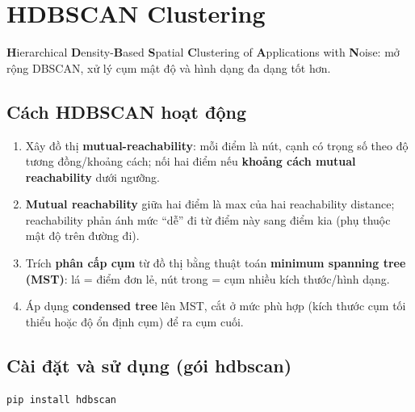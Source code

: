 \section{HDBSCAN Clustering}
\label{sec:hdbscan}

\begin{dinhnghia}[title={HDBSCAN}]
\textbf{H}ierarchical \textbf{D}ensity-\textbf{B}ased \textbf{S}patial \textbf{C}lustering of \textbf{A}pplications with \textbf{N}oise:
mở rộng DBSCAN, xử lý cụm mật độ và hình dạng đa dạng tốt hơn.
\end{dinhnghia}

\subsection{Cách HDBSCAN hoạt động}

\begin{phuongphap}[title={Mutual reachability và phân cấp}]
\begin{enumerate}
  \item Xây đồ thị \textbf{mutual-reachability}: mỗi điểm là nút, cạnh có trọng số theo độ tương đồng/khoảng cách; nối hai điểm nếu \textbf{khoảng cách mutual reachability} dưới ngưỡng.
  \item \textbf{Mutual reachability} giữa hai điểm là max của hai reachability distance; reachability phản ánh mức ``dễ'' đi từ điểm này sang điểm kia (phụ thuộc mật độ trên đường đi).
  \item Trích \textbf{phân cấp cụm} từ đồ thị bằng thuật toán \textbf{minimum spanning tree (MST)}: lá = điểm đơn lẻ, nút trong = cụm nhiều kích thước/hình dạng.
  \item Áp dụng \textbf{condensed tree} lên MST, cắt ở mức phù hợp (kích thước cụm tối thiểu hoặc độ ổn định cụm) để ra cụm cuối.
\end{enumerate}
\end{phuongphap}

\subsection{Cài đặt và sử dụng (gói hdbscan)}

\begin{vidu}[title={Cài đặt pip}]
\begin{lstlisting}
pip install hdbscan
\end{lstlisting}
\end{vidu}

